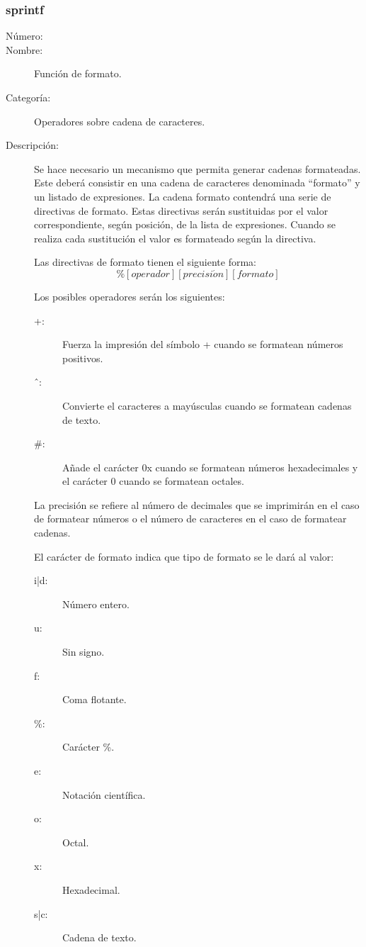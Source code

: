\subsubsection{sprintf}
\begin{framed}
	\begin{description}
		\item [Número:] \cn
		\item [Nombre:] Función de formato.
		\item [Categoría:] Operadores sobre cadena de caracteres.
		\item [Descripción:] Se hace necesario un mecanismo que permita generar cadenas formateadas. Este deberá consistir
		en una cadena de caracteres denominada ``formato'' y un listado de expresiones. La cadena formato contendrá una serie de
		directivas de formato. Estas directivas serán sustituidas por el valor correspondiente, según posición, de la
		lista de expresiones. Cuando se realiza cada sustitución el valor es formateado según la directiva.
		
		Las directivas de formato tienen el siguiente forma:
		$$\%[operador][precisi\acute{o}n][formato]$$
		
		Los posibles operadores serán los siguientes:
		\begin{description}
			\item[+:] Fuerza la impresión del símbolo + cuando se formatean números positivos.
			\item[\^\ :] Convierte el caracteres a mayúsculas cuando se formatean cadenas de texto.
			\item[\#:] Añade el carácter 0x cuando se formatean números hexadecimales y el carácter 0 cuando se formatean octales.
		\end{description}
	
		La precisión se refiere al número de decimales que se imprimirán en el caso de formatear
		números o el número de caracteres en el caso de formatear cadenas.			

		El carácter de formato indica que tipo de formato se le dará al valor:
		\begin{description}
			\item[i|d:] Número entero.
			\item[u:] Sin signo.
			\item[f:] Coma flotante.
			\item[\%:] Carácter \%.
			\item[e:] Notación científica.
			\item[o:] Octal.
			\item[x:] Hexadecimal.
			\item[s|c:] Cadena de texto.
		\end{description}
	\end {description}
\end{framed}

